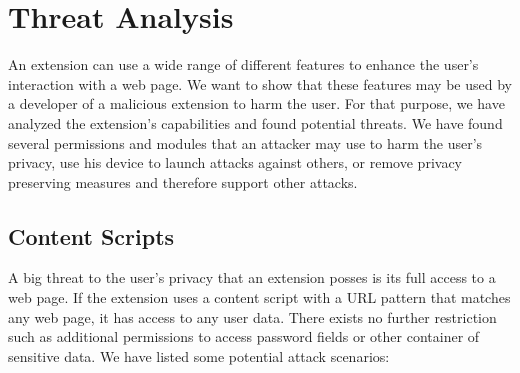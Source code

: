 
\chapter{Threat Analysis}

	An extension can use a wide range of different features to enhance the user's interaction with a web page. We want to show that these features may be used by a developer of a malicious extension to harm the user. For that purpose, we have analyzed the extension's capabilities and found potential threats. We have found several permissions and modules that an attacker may use to harm the user's privacy, use his device to launch attacks against others, or remove privacy preserving measures and therefore support other attacks. %

\section{Content Scripts}

	A big threat to the user's privacy that an extension posses is its full access to a web page. If the extension uses a content script with a URL pattern that matches any web page, it has access to any user data. There exists no further restriction such as additional permissions to access password fields or other container of sensitive data. We have listed some potential attack scenarios:
	
